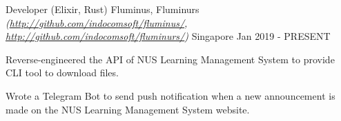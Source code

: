 

\begin{cventries}


  \cventry
  {Developer (Elixir, Rust)} %
  {Fluminus, Fluminurs \textmd{\em\tiny(\url{http://github.com/indocomsoft/fluminus/}, \url{http://github.com/indocomsoft/fluminurs/})}} %
  {Singapore} %
  {Jan 2019 - PRESENT} %
  {
    \begin{cvitems} %
      \item {Reverse-engineered the API of NUS Learning Management System to provide CLI tool to download files.}
      \item {Wrote a Telegram Bot to send push notification when a new announcement is made on the NUS Learning Management System website.}
    \end{cvitems}
  }


\end{cventries}
